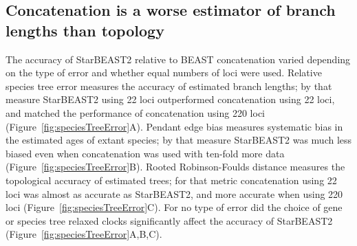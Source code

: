 \documentclass[nogrid]{MBE}%
\begin{document}
\subsection{Concatenation is a worse estimator of branch lengths than topology}

The accuracy of StarBEAST2 relative to BEAST concatenation varied depending on the
type of error and whether equal numbers of loci were used. Relative species tree
error measures the accuracy of estimated branch lengths; by that measure
StarBEAST2 using 22 loci outperformed concatenation using 22 loci, and matched
the performance of concatenation using 220 loci
(Figure~\ref{fig:speciesTreeError}A). Pendant edge bias measures systematic bias
in the estimated ages of extant species; by that measure StarBEAST2 was much
less biased even when concatenation was used with ten-fold more data
(Figure~\ref{fig:speciesTreeError}B). Rooted Robinson-Foulds distance measures
the topological accuracy of estimated trees; for that metric concatenation using
22 loci was almost as accurate as StarBEAST2, and more accurate when using
220 loci (Figure~\ref{fig:speciesTreeError}C). For no type of error did the
choice of gene or species tree relaxed clocks significantly affect the accuracy of StarBEAST2
(Figure~\ref{fig:speciesTreeError}A,B,C).
\end{document}
